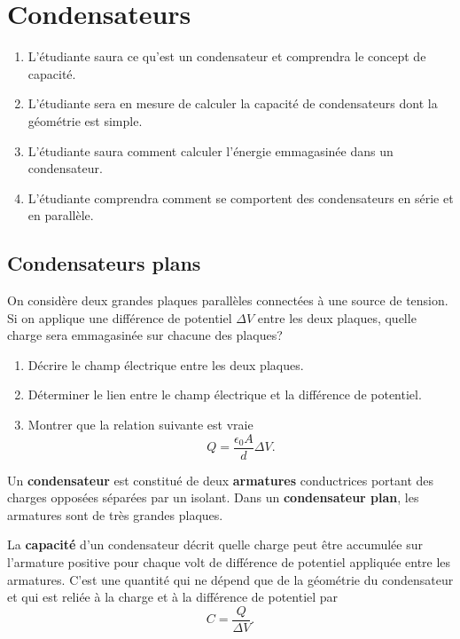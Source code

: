 \chapter{Condensateurs}


\begin{enumerate}
  \item L'étudiante saura ce qu'est un condensateur et comprendra le concept de
    capacité.
  \item L'étudiante sera en mesure de calculer la capacité de condensateurs dont
    la géométrie est simple.
  \item L'étudiante saura comment calculer l'énergie emmagasinée dans un
    condensateur.
  \item L'étudiante comprendra comment se comportent des condensateurs en série
    et en parallèle.
\end{enumerate}


\section{Condensateurs plans}


\begin{diapobox}
On considère deux grandes plaques parallèles connectées à une source de
tension.  Si on applique une différence de potentiel $\Delta V$ entre les deux
plaques, quelle charge sera emmagasinée sur chacune des plaques?

\begin{enumerate}
  \item Décrire le champ électrique entre les deux plaques.
  \item Déterminer le lien entre le champ électrique et la différence de
    potentiel.
  \item Montrer que la relation suivante est vraie
    $$Q = \frac{\epsilon_0 A}{d} \Delta V.$$
\end{enumerate}
\end{diapobox}


Un \textbf{condensateur} est constitué de deux \textbf{armatures} conductrices
portant des charges opposées séparées par un isolant. Dans un
\textbf{condensateur plan}, les armatures sont de très grandes plaques.

La \textbf{capacité} d'un condensateur décrit quelle charge peut être accumulée
sur l'armature positive pour chaque volt de différence de potentiel appliquée
entre les armatures. C'est une quantité qui ne dépend que de la géométrie du
condensateur et qui est reliée à la charge et à la différence de potentiel par
$$C = \frac{Q}{\Delta V}.$$

